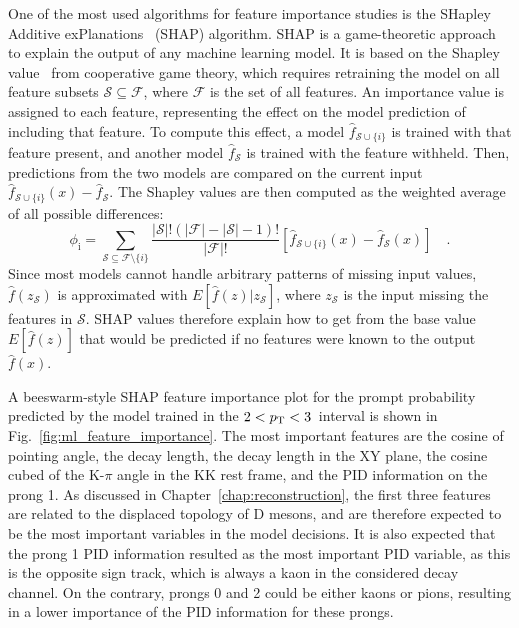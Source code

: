One of the most used algorithms for feature importance studies is the SHapley Additive exPlanations~\cite{lundberg2017unified} (SHAP) algorithm. SHAP is a game-theoretic approach to explain the output of any machine learning model. It is based on the Shapley value~\cite{lipovetsky2001analysis} from cooperative game theory, which requires retraining the model on all feature subsets $\mathcal{S}\subseteq \mathcal{F}$, where $\mathcal{F}$ is the set of all features. An importance value is assigned to each feature, representing the effect on the model prediction of including that feature. To compute this effect, a model $\widehat{f}_{\mathcal{S}\cup\{i\}}$ is trained with that feature present, and another model $\widehat{f}_\mathcal{S}$ is trained with the feature withheld. Then, predictions from the two
models are compared on the current input \mbox{$\widehat{f}_{\mathcal{S}\cup\{i\}} (x) - \widehat{f}_\mathcal{S}$}. The Shapley values are then computed as the weighted average of all possible differences:
\begin{equation*}
    \phi_\mathrm{i} = \sum_{\mathcal{S}\subseteq \mathcal{F}\setminus\{i\}} \frac{|\mathcal{S}|!(|\mathcal{F}|-|\mathcal{S}|-1)!}{|\mathcal{F}|!} \left[\widehat{f}_{\mathcal{S}\cup\{i\}}(x) - \widehat{f}_\mathcal{S}(x)\right]\quad .
\end{equation*}
Since most models cannot handle arbitrary patterns of missing input values, $\widehat{f} (z_\mathcal{S})$ is approximated with $E[\widehat{f}(z) | z_\mathcal{S}]$, where $z_\mathcal{S}$ is the input missing the features in $\mathcal{S}$. SHAP values therefore explain how to get from the base value $E[\widehat{f}(z)]$ that would be predicted if no features were known to the output $\widehat{f}(x)$.

A beeswarm-style SHAP feature importance plot for the prompt \ds probability predicted by the model trained in the $2<p_\mathrm{T}<3$~\gevc interval is shown in Fig.~\ref{fig:ml_feature_importance}. The most important features are the cosine of pointing angle, the decay length, the decay length in the XY plane, the cosine cubed of the K-$\pi$ angle in the KK rest frame, and the PID information on the prong 1. As discussed in Chapter~\ref{chap:reconstruction}, the first three features are related to the displaced topology of D mesons, and are therefore expected to be the most important variables in the model decisions. It is also expected that the prong 1 PID information resulted as the most important PID variable, as this is the opposite sign track, which is always a kaon in the considered decay channel. On the contrary, prongs 0 and 2 could be either kaons or pions, resulting in a lower importance of the PID information for these prongs. 

